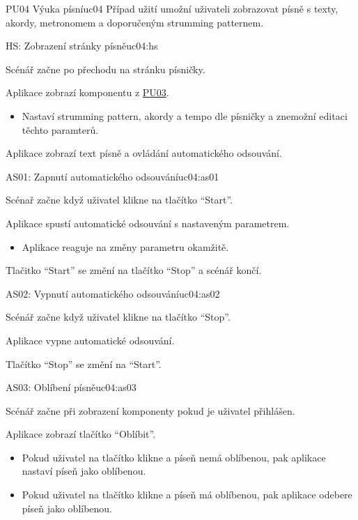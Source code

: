 \begin{usecase}{PU04 Výuka písní}{uc04}
    Případ užití umožní uživateli zobrazovat písně s texty, akordy, metronomem a doporučeným strumming patternem.

    \begin{scenario}{HS: Zobrazení stránky písně}{uc04:hs}
        \item Scénář začne po přechodu na stránku písničky.
        \item Aplikace zobrazí komponentu z \hyperref[uc03]{PU03}.
        \begin{itemize}
            \item Nastaví strumming pattern, akordy a tempo dle písničky a znemožní editaci těchto paramterů.
        \end{itemize}
        \item Aplikace zobrazí text písně a ovládání automatického odsouvání.
    \end{scenario}
   
    \begin{scenario}{AS01: Zapnutí automatického odsouvání}{uc04:as01}
        \item Scénař začne když uživatel klikne na tlačítko \enquote{Start}.
        \item Aplikace spustí automatické odsouvání s nastaveným parametrem.
        \begin{itemize}
            \item Aplikace reaguje na změny parametru okamžitě.
        \end{itemize}
        \item Tlačitko \enquote{Start} se změní na tlačítko \enquote{Stop} a scénář končí.
    \end{scenario}

    \begin{scenario}{AS02: Vypnutí automatického odsouvání}{uc04:as02}
        \item Scénář začne když uživatel klikne na tlačítko \enquote{Stop}.
        \item Aplikace vypne automatické odsouvání.
        \item Tlačítko \enquote{Stop} se změní na \enquote{Start}.
    \end{scenario}

    \begin{scenario}{AS03: Oblíbení písně}{uc04:as03}
        \item Scénář začne při zobrazení komponenty pokud je uživatel přihlášen.
        \item Aplikace zobrazí tlačítko \enquote{Oblíbit}.
        \begin{itemize}
            \item Pokud uživatel na tlačítko klikne a píseň nemá oblíbenou, pak aplikace nastaví píseň jako oblíbenou.
            \item Pokud uživatel na tlačítko klikne a píseň má oblíbenou, pak aplikace odebere píseň jako oblíbenou.
        \end{itemize}
    \end{scenario}
\end{usecase}
